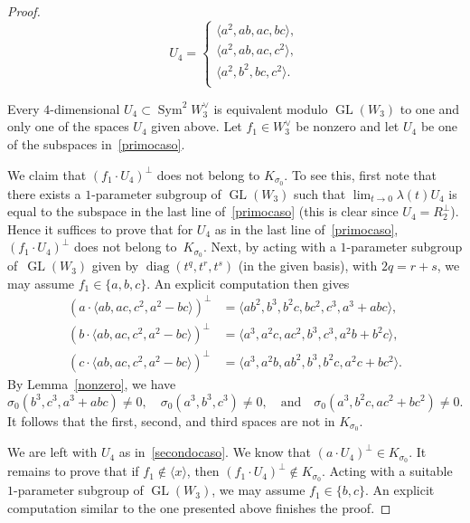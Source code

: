 \documentclass[11pt]{article}
\theoremstyle{definition}
\let\la\langle
\let\ra\rangle
\DeclareMathOperator{\GL}{GL}
\DeclareMathOperator{\Sym}{Sym}
\DeclareMathOperator{\diag}{diag}
\begin{document}
\begin{proof}
\begin{minipage}[m]{.5\textwidth}
\end{minipage}
\hfill
{}
\hfill
\begin{minipage}[m]{.4\textwidth}
\begin{equation}\label{secondocaso}
U_4=
\begin{cases}
\la a^2,ab,ac,bc\ra, \\
\la a^2,ab,ac,c^2\ra, \\
\la a^2,b^2,bc,c^2\ra.\\
\end{cases}
\end{equation}
\end{minipage}
\par\smallskip\noindent
Every $4$-dimensional $U_4\subset \Sym^2 \!W^{\vee}_3$ is equivalent modulo $\GL(W_3)$ to one and only one of the spaces $U_4$ given above. Let $ f_1\in W_3^{\vee}$ be nonzero and let $U_4$ be one of the subspaces in~\eqref{primocaso}.

We claim that $(f_1\cdot U_4)^{\bot}$ does not belong to $K_{\sigma_0}$. To see this, first note that there exists a $1$-parameter subgroup of $\GL(W_3)$ such that $\lim_{t\to 0}\lambda(t)U_4$ is equal to the subspace in the last line of~\eqref{primocaso} (this is clear since $U_4=R_2^{\bot}$). Hence it suffices
to prove that for $U_4$ as in the last line of~\eqref{primocaso}, $(f_1\cdot U_4)^{\bot}$ does not belong to~$K_{\sigma_0}$. Next, by acting with a $1$-parameter subgroup of~$\GL(W_3)$ given by $\diag(t^q,t^r,t^s)$ (in the given basis), with $2q=r+s$, we may assume $f_1\in\{a,b,c\}$. An explicit computation then gives
\begin{align*}
(a\cdot \la ab,ac,c^2,a^2-bc\ra)^{\bot} & = \la ab^2,b^3,b^2c,bc^2,c^3,a^3+abc\ra, \\
(b\cdot \la ab,ac,c^2,a^2-bc\ra)^{\bot} & = \la a^3,a^2 c,ac^2,b^3,c^3,a^2b+b^2c\ra, \\
(c\cdot \la ab,ac,c^2,a^2-bc\ra)^{\bot} & = \la a^3,a^2 b,ab^2,b^3,b^2c,a^2c+bc^2\ra.
\end{align*}
By Lemma~\ref{nonzero}, we have
\[
\sigma_0(b^3,c^3,a^3+abc)\ne 0,\quad\sigma_0(a^3,b^3,c^3)\ne 0,\quad\text{and}\quad\sigma_0(a^3,b^2c,ac^2+bc^2)\ne 0.
\]
It follows that the first, second, and third spaces are not in $K_{\sigma_0}$.

We are left with $U_4$ as in~\eqref{secondocaso}. We know that $(a\cdot U_4)^{\bot}\in K_{\sigma_0}$. It remains to prove that if $f_1\notin\la x\ra$, then $(f_1\cdot U_4)^{\bot}\notin K_{\sigma_0}$. Acting with a suitable $1$-parameter subgroup of
$\GL(W_3)$, we may assume $f_1\in\{b,c\}$. An explicit computation similar to the one presented above finishes the proof.
\end{proof}
\end{document}
